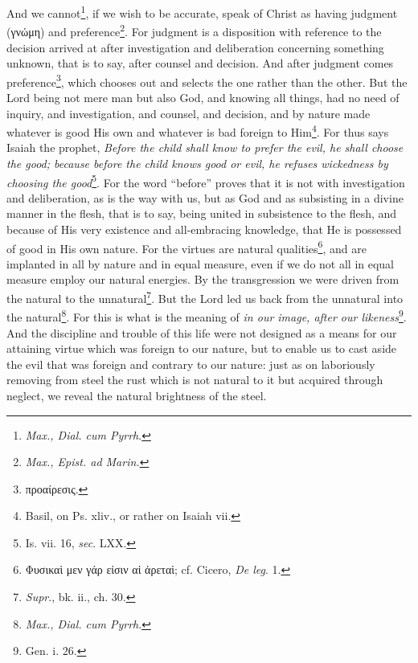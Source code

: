 And we cannot\footnote{\emph{Max., Dial. cum Pyrrh}.}, if we wish to be accurate, speak of Christ as having judgment (\textgreek{γνώμη}) and preference\footnote{\emph{Max., Epist. ad Marin.}}. For judgment is a disposition with reference to the decision arrived at after investigation and deliberation concerning something unknown, that is to say, after counsel and decision. And after judgment comes preference\footnote{\textgreek{προαίρεσις}.}, which chooses out and selects the one rather than the other. But the Lord being not mere man but also God, and knowing all things, had no need of inquiry, and investigation, and counsel, and decision, and by nature made whatever is good His own and whatever is bad foreign to Him\footnote{Basil, on Ps. xliv., or rather on Isaiah vii.}. For thus says Isaiah the prophet, \emph{Before the child shall know to prefer the evil, he shall choose the good; because before the child knows good or evil, he refuses wickedness by choosing the good}\footnote{Is. vii. 16, \emph{sec}. LXX.}. For the word “before” proves that it is not with investigation and deliberation, as is the way with us, but as God and as subsisting in a divine manner in the flesh, that is to say, being united in subsistence to the flesh, and because of His very existence and all-embracing knowledge, that He is possessed of good in His own nature. For the virtues are natural qualities\footnote{\textgreek{Φυσικαὶ μεν γάρ εἰσιν αἱ ἀρεταὶ}; cf. Cicero, \emph{De leg}. 1.}, and are implanted in all by nature and in equal measure, even if we do not all in equal measure employ our natural energies. By the transgression we were driven from the natural to the unnatural\footnote{\emph{Supr}., bk. ii., ch. 30.}. But the Lord led us back from the unnatural into the natural\footnote{\emph{Max., Dial. cum Pyrrh}.}. For this is what is the meaning of \emph{in our image, after our likeness}\footnote{Gen. i. 26.}. And the discipline and trouble of this life were not designed as a means for our attaining virtue which was foreign to our nature, but to enable us to cast aside the evil that was foreign and contrary to our nature: just as on laboriously removing from steel the rust which is not natural to it but acquired through neglect, we reveal the natural brightness of the steel.


